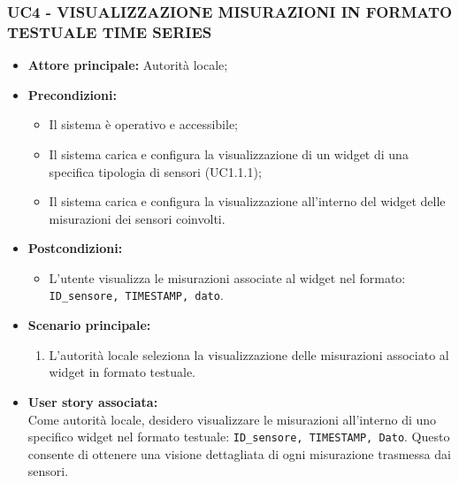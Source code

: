 \subsubsection{UC4 - VISUALIZZAZIONE MISURAZIONI IN FORMATO TESTUALE TIME SERIES}
\begin{itemize}
      \item \textbf{Attore principale:} Autorità locale;
      \item \textbf{Precondizioni:}
            \begin{itemize}
                  \item Il sistema è operativo e accessibile;
                  \item Il sistema carica e configura la visualizzazione di un widget di una specifica tipologia di sensori (UC1.1.1);
                  \item Il sistema carica e configura la visualizzazione all'interno del widget delle misurazioni dei sensori coinvolti.
            \end{itemize}
      \item \textbf{Postcondizioni:}
            \begin{itemize}
                  \item L'utente visualizza le misurazioni associate al widget nel formato: \texttt{ID\_sensore, TIMESTAMP, dato}.
            \end{itemize}
      \item \textbf{Scenario principale:}
            \begin{enumerate}
                  \item L'autorità locale seleziona la visualizzazione delle misurazioni associato al widget in formato testuale.
            \end{enumerate}
      \item \textbf{User story associata:} \\
            Come autorità locale, desidero visualizzare le misurazioni all'interno di uno specifico widget nel formato testuale: \texttt{ID\_sensore, TIMESTAMP, Dato}. Questo consente di ottenere una visione dettagliata di ogni misurazione trasmessa dai sensori.
\end{itemize}